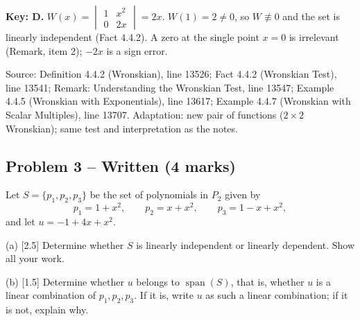 \documentclass[11pt,a4paper]{article}
\newcommand{\Src}[1]{{\footnotesize\color{black!65}Source: #1}}
\begin{document}
\textbf{Key: D.} $W(x)=\begin{vmatrix}1&x^{2}\\0&2x\end{vmatrix}=2x$. $W(1)=2\neq0$, so $W\not\equiv0$ and the set is linearly independent (Fact 4.4.2). A zero at the single point $x=0$ is irrelevant (Remark, item 2); $-2x$ is a sign error.\par
\Src{Definition 4.4.2 (Wronskian), line 13526; Fact 4.4.2 (Wronskian Test), line 13541; Remark: Understanding the Wronskian Test, line 13547; Example 4.4.5 (Wronskian with Exponentials), line 13617; Example 4.4.7 (Wronskian with Scalar Multiples), line 13707. Adaptation: new pair of functions ($2\times2$ Wronskian); same test and interpretation as the notes.}\par
\subsection*{Problem 3 -- Written (4 marks)}
Let $S=\{p_1,p_2,p_3\}$ be the set of polynomials in $P_2$ given by\[p_1=1+x^{2},\qquad p_2=x+x^{2},\qquad p_3=1-x+x^{2},\]and let $u=-1+4x+x^{2}$.\par (a) [2.5] Determine whether $S$ is linearly independent or linearly dependent. Show all your work.\par (b) [1.5] Determine whether $u$ belongs to $\operatorname{span}(S)$, that is, whether $u$ is a linear combination of $p_1,p_2,p_3$. If it is, write $u$ as such a linear combination; if it is not, explain why.\par
\end{document}
